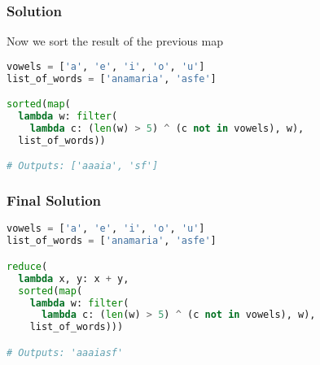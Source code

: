 \documentclass{beamer}
\begin{document}
\begin{frame}[fragile]
\frametitle{Solution}
Now we sort the result of the previous map

\begin{lstlisting}[language=python]
vowels = ['a', 'e', 'i', 'o', 'u']
list_of_words = ['anamaria', 'asfe']

sorted(map(
  lambda w: filter(
    lambda c: (len(w) > 5) ^ (c not in vowels), w),
  list_of_words))

# Outputs: ['aaaia', 'sf']
\end{lstlisting}
\end{frame}

\begin{frame}[fragile]
\frametitle{Final Solution}
\begin{lstlisting}[language=python]
vowels = ['a', 'e', 'i', 'o', 'u']
list_of_words = ['anamaria', 'asfe']

reduce(
  lambda x, y: x + y,
  sorted(map(
    lambda w: filter(
      lambda c: (len(w) > 5) ^ (c not in vowels), w),
    list_of_words)))

# Outputs: 'aaaiasf'

\end{lstlisting}
\end{frame}
\end{document}
